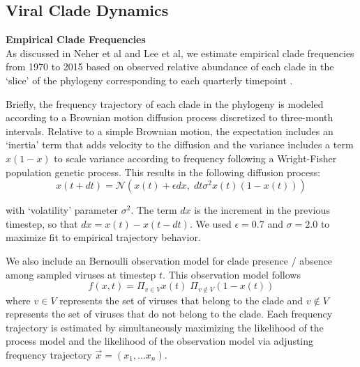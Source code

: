 \documentclass[11pt,oneside,letterpaper]{article}
\begin{document}
\subsection*{Viral Clade Dynamics}

\textbf{Empirical Clade Frequencies}\\
As discussed in Neher et al and Lee et al, we estimate empirical clade frequencies from 1970 to 2015 based on observed relative abundance of each clade in the `slice' of the phylogeny corresponding to each quarterly timepoint \citep{lee2018deep,neher2016prediction}.

Briefly, the frequency trajectory of each clade in the phylogeny is modeled according to a Brownian motion diffusion process discretized to three-month intervals.
Relative to a simple Brownian motion, the expectation includes an `inertia' term that adds velocity to the diffusion and the variance includes a term $x(1-x)$ to scale variance according to frequency following a Wright-Fisher population genetic process.
This results in the following diffusion process:
\begin{equation}
  \label{eq_estimate_frequency}
x(t+dt) = \mathcal{N}\left(x(t) + \epsilon dx, \; dt \sigma^2 x(t) (1-x(t))\right)
\end{equation}

with `volatility' parameter $\sigma^2$.
The term $dx$ is the increment in the previous timestep, so that $dx = x(t) - x(t-dt)$.
We used $\epsilon = 0.7$ and $\sigma = 2.0$ to maximize fit to empirical trajectory behavior.

We also include an Bernoulli observation model for clade presence / absence among sampled viruses at timestep $t$.
This observation model follows
\begin{equation}
f(x,t) = \Pi_{v \in V} x(t) \; \Pi_{v \notin V} (1-x(t))
\end{equation}
where $v \in V$ represents the set of viruses that belong to the clade and $v \notin V$ represents the set of viruses that do not belong to the clade.
Each frequency trajectory is estimated by simultaneously maximizing the likelihood of the process model and the likelihood of the observation model via adjusting frequency trajectory $\vec{x} = (x_1, ... x_n)$.
\end{document}
